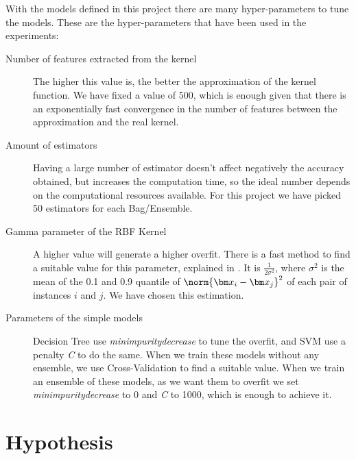 \begin{pre-delivery}
  With the models defined in this project there are many hyper-parameters to
  tune the models. These are the hyper-parameters that have been used in the
  experiments:
  \begin{description}
    \item[Number of features extracted from the kernel] The higher this value
    is, the better the approximation of the kernel function. We have fixed a
    value of 500, which is enough given that there is an exponentially fast
    convergence in the number of features between the approximation and
    the real kernel\cite{rahimi2008random}.
    \item[Amount of estimators] Having a large number of estimator doesn't
    affect negatively the accuracy obtained, but increases the computation
    time, so the ideal number depends on the computational resources
    available. For this project we have picked 50 estimators for each Bag/Ensemble.
    \item[Gamma parameter of the RBF Kernel] A higher value will generate a
    higher overfit. There is a fast method to find a suitable value for this
    parameter, explained in
    \cite{caputo2002appearance}
    . It is $\frac{1}{2\sigma^2}$, where $\sigma^2$ is the mean of the 0.1 and
    0.9 quantile of $\norm{\vx_i - \vx_j}^2$ of
    each pair of instances $i$ and $j$. We have chosen this estimation.
    \item[Parameters of the simple models] Decision Tree use
    \textit{min\tu impurity\tu decrease} to tune the overfit, and SVM use a
    penalty \textit{C} to do the same. When we train these models without
    any ensemble, we use Cross-Validation to find a suitable value. When we
    train an ensemble of these models, as we want them to overfit we set
    \textit{min\tu impurity\tu decrease} to 0 and \textit{C} to 1000, which
    is enough to achieve it.
  \end{description}
\end{pre-delivery}
\section{Hypothesis}



